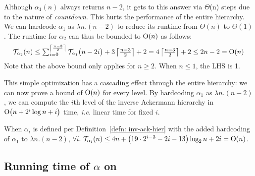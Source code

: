 \begin{rem} \label{rem: inv-ack-hardcode}
Although $\alpha_1 (n)$ always returns $n-2$, it gets to this answer
via $\Theta$(n) steps due to the nature of \emph{countdown}.
This hurts the performance of the entire hierarchy. 
We can hardcode $\alpha_1$ as $\lambda n.(n-2)$ to reduce its runtime
from $\Theta(n)$ to $\Theta(1)$.
The runtime for $\alpha_2$ can thus be bounded to $\text{O}(n)$ as follows:
\begin{equation*}
\mathcal{T}_{\alpha_2}(n)
 \le \textstyle \sum_{i=0}^{\left\lceil \frac{n-3}{2} \right\rceil} \mathcal{T}_{\alpha_1}\big(n-2i\big) + 3\left\lceil \frac{n-3}{2} \right\rceil + 2  =  4\left\lceil \frac{n-3}{2} \right\rceil + 2
 \le 2n - 2 = \text{O}(n)
\end{equation*}
Note that the above bound only applies for $n\ge 2$. When $n\le 1$, the LHS is 1.
\end{rem}

This simple optimization has a cascading effect through the entire hierarchy:
we can now prove a bound of $\text{O}(n)$ for every level.
By hardcoding $\alpha_1$ as $\lambda n.(n-2)$, we can compute the $i$th level of the inverse Ackermann hierarchy in \linebreak $\text{O}\big(n + 2^i\log n  + i\big)$ time, \emph{i.e.} linear time for fixed $i$.
\begin{thm} \label{thm: inv-ack-hier-runtime-improved}
	When $\alpha_i$ is defined per Definition~\ref{defn: inv-ack-hier} with the added hardcoding of $\alpha_1$ to $\lambda n. (n - 2)$, $\forall i.~\mathcal{T}_{\alpha_i}(n) \le 4n + \left(19\cdot 2^{i-3} - 2i - 13\right)\log_2n + 2i = \text{O}(n)$.
\end{thm}

\subsection{Running time of $\alpha$ on } %

